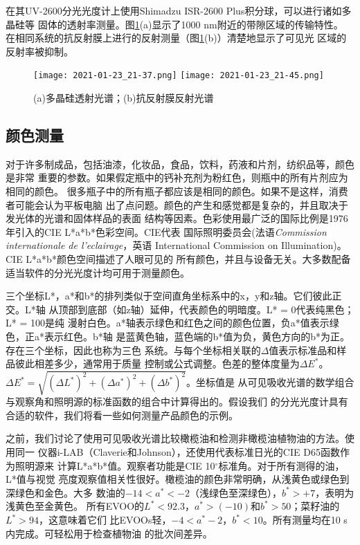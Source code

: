 在其UV-2600分光光度计上使用Shimadzu ISR-2600 Plus积分球，可以进行诸如多晶硅等
固体的透射率测量。图\ref{fig:5.45}(a)显示了1000 nm附近的带隙区域的传输特性。
在相同系统的抗反射膜上进行的反射测量（图\ref{fig:5.45}(b)）清楚地显示了可见光
区域的反射率被抑制。
\begin{figure}[htpb]
    \centering
    \texttt{[image: 2021-01-23\_21-37.png]}
    \texttt{[image: 2021-01-23\_21-45.png]}
    \caption{(a)多晶硅透射光谱；(b)抗反射膜反射光谱}
    \label{fig:5.45}
\end{figure}
\subsection{颜色测量}
对于许多制成品，包括油漆，化妆品，食品，饮料，药液和片剂，纺织品等，颜色是非常
重要的参数。如果假定瓶中的钙补充剂为粉红色，则瓶中的所有片剂应为相同的颜色。
很多瓶子中的所有瓶子都应该是相同的颜色。如果不是这样，消费者可能会认为平板电脑
出了点问题。颜色的产生和感觉都是复杂的，并且取决于发光体的光谱和固体样品的表面
结构等因素。色彩使用最广泛的国际比例是1976年引入的CIE L*a*b*色彩空间。CIE代表
国际照明委员会(法语\emph{Commission internationale de l'eclairage}，英语
International Commission on Illumination)。 CIE L*a*b*颜色空间描述了人眼可见的
所有颜色，并且与设备无关。大多数配备适当软件的分光光度计均可用于测量颜色。

三个坐标L*，a*和b*的排列类似于空间直角坐标系中的x，y和z轴。它们彼此正交。L*轴
从顶部到底部（如z轴）延伸，代表颜色的明暗度。L* = 0代表纯黑色； L* = 100是纯
漫射白色。a*轴表示绿色和红色之间的颜色位置，负a*值表示绿色，正a*表示红色。b*轴
是蓝黄色轴，蓝色端的b*值为负，黄色方向的b*为正。存在三个坐标，因此也称为三色
系统。与每个坐标相关联的$\Delta$值表示标准品和样品彼此相差多少，通常用于质量
控制或公式调整。色差的整体度量为$\Delta E^\ast$。
$\Delta E^ * =\sqrt{(\Delta L^ *)^2+(\Delta a^ *)^2+(\Delta b^*)^2}$。坐标值是
从可见吸收光谱的数学组合与观察角和照明源的标准函数的组合中计算得出的。假设我们
的分光光度计具有合适的软件，我们将看一些如何测量产品颜色的示例。

之前，我们讨论了使用可见吸收光谱比较橄榄油和检测非橄榄油植物油的方法。使用同一
仪器i-LAB（Claverie和Johnson），还使用代表标准日光的CIE D65函数作为照明源来
计算L*a*b*值。观察者功能是CIE 10$^\circ$标准角。对于所有测得的油，L*值与视觉
亮度观察值相关性很好。橄榄油的颜色非常明确，从浅黄色或绿色到深绿色和金色。大多
数油的$-14<a^*<-2$（浅绿色至深绿色），$b^*> +7$，表明为浅黄色至金黄色。
所有EVOO的$L^*<92.3$，$a^*>(-10)$和$b^ *> 50$；菜籽油的$L^*> 94$，这意味着它们
比EVOOs轻，$-4<a^*-2$，$b^*<10$。所有测量均在10 s内完成。可轻松用于检查植物油
的批次间差异。

